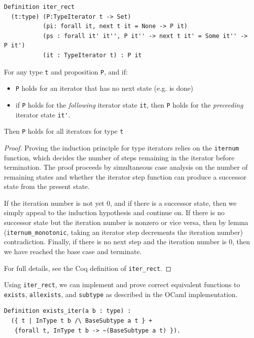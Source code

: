 \documentclass[a4paper,english]{lipics-v2019}
\begin{document}
\begin{theorem}
\begin{small}\begin{verbatim}
Definition iter_rect
  (t:type) (P:TypeIterator t -> Set)
           (pi: forall it, next t it = None -> P it)
           (ps : forall it' it'', P it'' -> next t it' = Some it'' -> P it')
           (it : TypeIterator t) : P it  
\end{verbatim}\end{small}

For any type \verb|t| and proposition \verb|P|, and if:
\begin{itemize} 
	\item \verb|P| holds for an iterator that has no next state (e.g. is done)
	\item if \verb|P| holds for the \emph{following} iterator state \verb|it|,
	then \verb|P| holds for the \emph{preceeding} iterator state \verb|it'|.
\end{itemize}
Then \verb|P| holds for all iterators for type \verb|t|
\end{theorem}
\begin{proof}
Proving the induction principle for type iterators relies on the \verb|iternum|
function, which decides the number of steps remaining in the iterator before termination.
The proof proceeds by simultaneous case analysis on the number of remaining states and
whether the iterator step function can produce a successor state from the present state.

If the iteration number is not yet 0, and if there is a successor state, then
we simply  appeal to the induction hypothesis and continue on. If there is no
successor state but  the iteration number is nonzero or vice versa, then by
lemma (\verb|iternum_monotonic|, taking an iterator step decrements the
iteration number) contradiction. Finally, if there is no next step and the iteration
number is 0, then we have reached the base case and terminate.

For full details, see the Coq definition of \verb|iter_rect|.
\end{proof}

Using \verb|iter_rect|, we can implement and prove correct equivalent functions
to \verb|exists|, \verb|allexists|, and \verb|subtype| as described in the
OCaml implementation.

\begin{small}\begin{verbatim}
Definition exists_iter(a b : type) : 
  ({ t | InType t b /\ BaseSubtype a t } +
   {forall t, InType t b -> ~(BaseSubtype a t) }).
\end{verbatim}\end{small}
\end{document}
